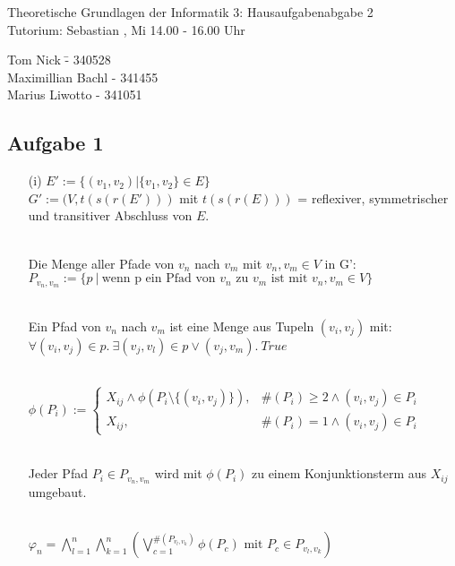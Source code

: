 \documentclass[a4paper,10pt]{article}
\begin{document}
\begin{center}
\Large{Theoretische Grundlagen der Informatik 3: Hausaufgabenabgabe 2} \\
\large{Tutorium: Sebastian , Mi 14.00 - 16.00 Uhr}
\end{center}
\begin{tabbing}
Tom Nick \hspace{2cm}\= - 340528\\
Maximillian Bachl \> - 341455 \\
Marius Liwotto\> -  341051
\end{tabbing}
	\subsection*{Aufgabe 1}

	\begin{enumerate}
	\item[(i)]
	$E' := \lbrace (v_1, v_2) | \lbrace v_1, v_2 \rbrace \in E \rbrace$\\
	$G' := (V, t(s(r(E')))$ mit $t(s(r(E)))$ = reflexiver, symmetrischer und transitiver Abschluss von $E$.
	
	\ \\Die Menge aller Pfade von $v_n$ nach $v_m$ mit $v_n, v_m \in V$ in G':\\	
	\( P_{v_n,v_m} := \{p~|~\text{wenn p ein Pfad von $v_n$ zu $v_m$ ist mit $v_n, v_m \in V$} \}  \)
	
	\ \\Ein Pfad von $v_n$ nach $v_m$ ist eine Menge aus Tupeln $(v_i,v_j)$ mit:\\
	\( \forall (v_i,v_j) \in p.~\exists (v_j,v_l) \in p \vee (v_j,v_m).~True \)
	
	\ \\ \( \phi(P_i) := \begin{cases}
	X_{ij} \wedge \phi(P_i\setminus \{(v_i,v_j)\}), & \#(P_i) \geq 2 \wedge (v_i,v_j) \in P_i \\
	X_{ij},  & \#(P_i) = 1 \wedge (v_i,v_j) \in P_i
	\end{cases} \)
	
	\ \\Jeder Pfad $P_i \in P_{v_n,v_m}$ wird mit $\phi(P_i)$ zu einem Konjunktionsterm aus $X_{ij}$ \\
	umgebaut.
		
	\ \\ \( \varphi_n = \bigwedge\limits_{l = 1}^{n} \bigwedge\limits_{k = 1}^{n} 
	(\bigvee\limits_{c = 1}^{\#(P_{v_l,v_k})} \phi(P_c) \text{ mit }P_c \in P_{v_l,v_k}) \)
		

\end{enumerate}
\end{document}

